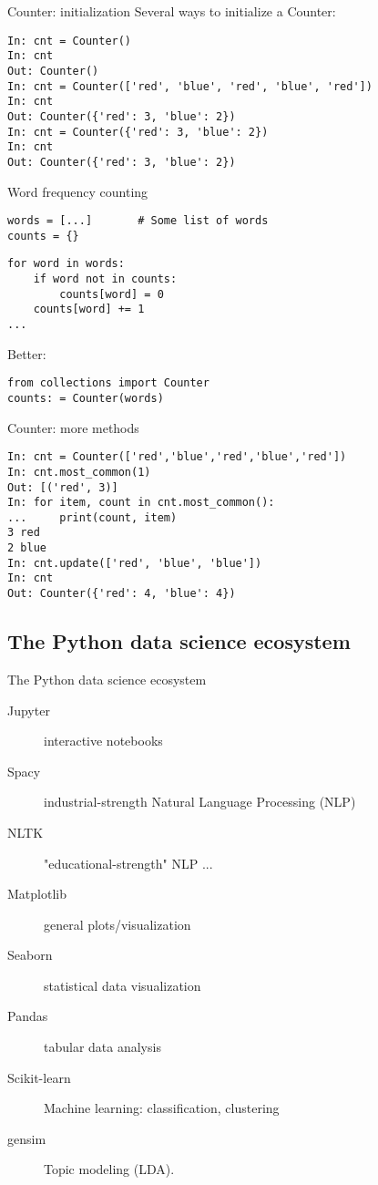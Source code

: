\documentclass[aspectratio=169,usenames,dvipsnames]{beamer}
\begin{document}
\begin{frame}[fragile]{Counter: initialization}
Several ways to initialize a Counter:\\

\begin{lstlisting}
In: cnt = Counter()
In: cnt
Out: Counter()
In: cnt = Counter(['red', 'blue', 'red', 'blue', 'red'])
In: cnt
Out: Counter({'red': 3, 'blue': 2})
In: cnt = Counter({'red': 3, 'blue': 2})
In: cnt
Out: Counter({'red': 3, 'blue': 2})
\end{lstlisting}
\end{frame}

\begin{frame}[fragile]{Word frequency counting}
\begin{lstlisting}
words = [...]       # Some list of words
counts = {}
\end{lstlisting}\pause
\begin{lstlisting}
for word in words:
    if word not in counts:
        counts[word] = 0
    counts[word] += 1
...
\end{lstlisting}
\pause
Better:
\begin{lstlisting}
from collections import Counter
counts: = Counter(words)
\end{lstlisting}
\end{frame}

\begin{frame}[fragile]{Counter: more methods}
\begin{lstlisting}
In: cnt = Counter(['red','blue','red','blue','red'])
In: cnt.most_common(1)
Out: [('red', 3)]
In: for item, count in cnt.most_common():
...     print(count, item)
3 red
2 blue
In: cnt.update(['red', 'blue', 'blue'])
In: cnt
Out: Counter({'red': 4, 'blue': 4})

\end{lstlisting}
\end{frame}


\subsection{The Python data science ecosystem}
\begin{frame}[fragile]{The Python data science ecosystem}
    \begin{description}
        \item[Jupyter] interactive notebooks
        \item[Spacy] industrial-strength Natural Language Processing (NLP)
        \item[NLTK] "educational-strength" NLP ...
        \item[Matplotlib] general plots/visualization
        \item[Seaborn] statistical data visualization
        \item[Pandas] tabular data analysis
        \item[Scikit-learn] Machine learning: classification, clustering
        \item[gensim] Topic modeling (LDA).
    \end{description}
\end{frame}
\end{document}
